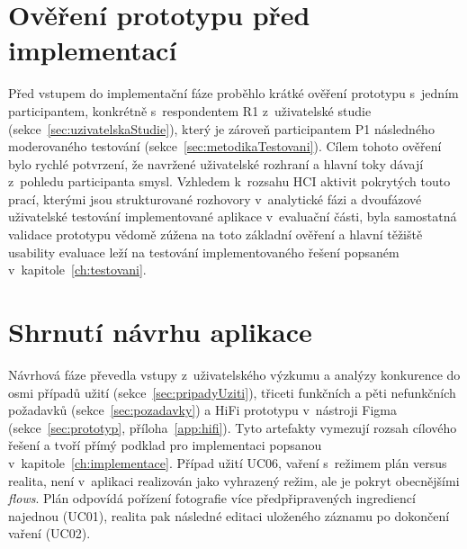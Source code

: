 \section{Ověření prototypu před implementací}
\label{sec:overeniPrototypu}

Před vstupem do implementační fáze proběhlo krátké ověření prototypu s~jedním participantem, konkrétně s~respondentem R1 z~uživatelské studie (sekce~\ref{sec:uzivatelskaStudie}), který je zároveň participantem P1 následného moderovaného testování (sekce~\ref{sec:metodikaTestovani}).
Cílem tohoto ověření bylo rychlé potvrzení, že navržené uživatelské rozhraní a hlavní toky dávají z~pohledu participanta smysl.
Vzhledem k~rozsahu HCI aktivit pokrytých touto prací, kterými jsou strukturované rozhovory v~analytické fázi a dvoufázové uživatelské testování implementované aplikace v~evaluační části, byla samostatná validace prototypu vědomě zúžena na toto základní ověření a hlavní těžiště usability evaluace leží na testování implementovaného řešení popsaném v~kapitole~\ref{ch:testovani}.

\section{Shrnutí návrhu aplikace}
\label{sec:shrnutiNavrhu}

Návrhová fáze převedla vstupy z~uživatelského výzkumu a analýzy konkurence do osmi případů užití (sekce~\ref{sec:pripadyUziti}), třiceti funkčních a pěti nefunkčních požadavků (sekce~\ref{sec:pozadavky}) a HiFi prototypu v~nástroji Figma (sekce~\ref{sec:prototyp}, příloha~\ref{app:hifi}).
Tyto artefakty vymezují rozsah cílového řešení a tvoří přímý podklad pro implementaci popsanou v~kapitole~\ref{ch:implementace}.
Případ užití UC06, vaření s~režimem plán versus realita, není v~aplikaci realizován jako vyhrazený režim, ale je pokryt obecnějšími \emph{flows}.
Plán odpovídá pořízení fotografie více předpřipravených ingrediencí najednou (UC01), realita pak následné editaci uloženého záznamu po dokončení vaření (UC02).

